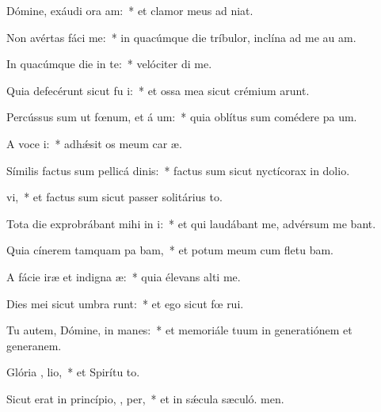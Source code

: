 \item Dómine, exáudi ora am:~* et clamor meus ad  niat.
\item Non avértas fáci   me:~* in quacúmque die tríbulor, inclína ad me au am.
\item In quacúmque die in te:~* velóciter di me.
\item Quia defecérunt sicut fu  i:~* et ossa mea sicut crémium arunt.
\item Percússus sum ut fœnum, et á  um:~* quia oblítus sum comédere pa um.
\item A voce  i:~* adhǽsit os meum car æ.
\item Símilis factus sum pellicá dinis:~* factus sum sicut nyctícorax in dolio.
\item {}vi,~* et factus sum sicut passer solitárius  to.
\item Tota die exprobrábant mihi in i:~* et qui laudábant me, advérsum me bant.
\item Quia cínerem tamquam pa bam,~* et potum meum cum fletu bam.
\item A fácie iræ et indigna æ:~* quia élevans alti me.
\item Dies mei sicut umbra runt:~* et ego sicut fœ rui.
\item Tu autem, Dómine, in  manes:~* et memoriále tuum in generatiónem et generanem.
\item Glória ,  lio,~* et Spirítu to.
\item Sicut erat in princípio,  ,  per,~* et in sǽcula sæculó. men.
